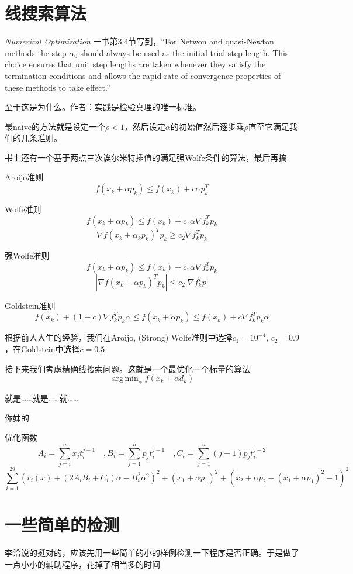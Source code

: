 \documentclass[a4paper, 11pt]{article}
\begin{document}
\section{线搜索算法}

\textit{Numerical Optimization} 一书第3.4节写到，``For Netwon and quasi-Newton methods the step $\alpha_0$ should always be used as the initial trial step length. This choice ensures that unit step lengths are taken whenever they satisfy the termination conditions and allows the rapid rate-of-convergence properties of these methods to take effect.''

至于这是为什么。作者：实践是检验真理的唯一标准。

最naive的方法就是设定一个$\rho<1$，然后设定$\alpha$的初始值然后逐步乘$\rho$直至它满足我们的几条准则。

书上还有一个基于两点三次诶尔米特插值的满足强Wolfe条件的算法，最后再搞

Aroijo准则
\[f(x_k+\alpha p_k)\le f(x_k)+c\alpha p_k^T\]

Wolfe准则
\[f(x_k+\alpha p_k)\le f(x_k)+c_1\alpha\nabla f_k^Tp_k\]
\[\nabla f(x_k+\alpha_kp_k)^Tp_k \ge c_2\nabla f_k^Tp_k\]

强Wolfe准则
\[f(x_k+\alpha p_k)\le f(x_k)+c_1\alpha\nabla f_k^Tp_k\]
\[|\nabla f(x_k+\alpha p_k)^Tp_k| \le c_2|\nabla f_k^Tp|\]

Goldstein准则
\[f(x_k)+(1-c)\nabla f_k^Tp_k\alpha \le f(x_k+\alpha p_k)\le f(x_k)+c\nabla f_k^T p_k\alpha\]

根据前人人生的经验，我们在Aroijo, (Strong) Wolfe准则中选择$c_1=10^{-4},\,c_2=0.9$，在Goldstein中选择$c=0.5$

接下来我们考虑精确线搜索问题。这就是一个最优化一个标量的算法
\[\mathop{\arg\,\min}_\alpha f(x_k+\alpha d_k)\]

就是……就是……就……

你妹的

优化函数
\[
A_i=\sum_{j=i}^{n}x_jt_i^{j-1}\quad, B_i=\sum_{j=1}^np_jt_i^{j-1}\quad, C_i=\sum_{j=1}^n(j-1)p_jt_i^{j-2}
\]
\[
\sum_{i=1}^{29}\left(r_i(x)+\left(2A_iB_i+C_i\right)\alpha -B_i^2\alpha^2\right)^2+(x_1+\alpha p_1)^2+(x_2+\alpha p_2-(x_1+\alpha p_1)^2-1)^2
\]

\section{一些简单的检测}

李洽说的挺对的，应该先用一些简单的小的样例检测一下程序是否正确。于是做了一点小小的辅助程序，花掉了相当多的时间
\end{document}
